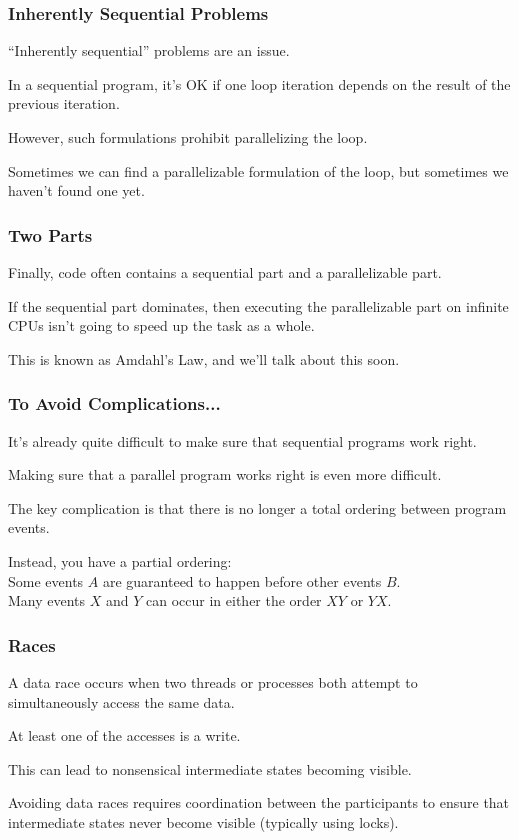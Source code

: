 \begin{frame}
\frametitle{Inherently Sequential Problems}

``Inherently sequential'' problems are an issue. 

In a sequential 
program, it's OK if one loop iteration depends on the result of the
previous iteration. 

However, such formulations prohibit parallelizing
the loop. 

Sometimes we can find a parallelizable formulation of the loop,
but sometimes we haven't found one yet.

\end{frame}




\begin{frame}
\frametitle{Two Parts}

Finally, code often contains a sequential part and a parallelizable
part.  

If the sequential part dominates, then
executing the parallelizable part on infinite CPUs isn't going to speed up the task as a whole. 

This is
known as Amdahl's Law, and we'll talk about this soon.


\end{frame}



\begin{frame}
\frametitle{To Avoid Complications...}

 It's already quite difficult to make sure that
sequential programs work right. 

Making sure that a parallel program
works right is even more difficult.

The key complication is that there is no longer a total ordering between
program events. 

Instead, you have a partial ordering:\\
\quad Some events $A$ are guaranteed to happen before other events $B$.\\
\quad Many events $X$  and $Y$ can occur in either the order $XY$ or $YX$.

\end{frame}



\begin{frame}
\frametitle{Races}

 A \alert{data race} occurs when two threads or processes both attempt to
simultaneously access the same data.

At least one of the accesses is a write. 

This can lead to nonsensical intermediate states becoming
visible.

Avoiding data races requires
coordination between the participants to ensure that intermediate
states never become visible (typically using locks). 


\end{frame}



